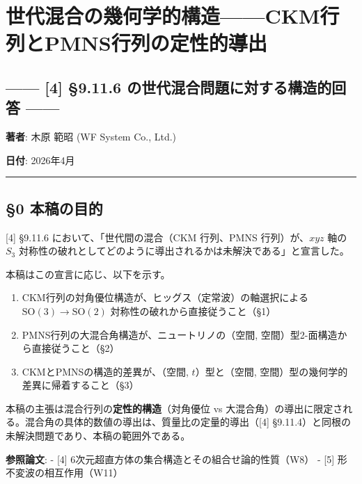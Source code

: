 \documentclass[
  a4paper,11pt]{ltjsarticle}
\author{}
\date{}
\providecommand{\tightlist}{%
  \setlength{\itemsep}{0pt}\setlength{\parskip}{0pt}}
\begin{document}
\section{世代混合の幾何学的構造------CKM行列とPMNS行列の定性的導出}\label{ux4e16ux4ee3ux6df7ux5408ux306eux5e7eux4f55ux5b66ux7684ux69cbux9020ckmux884cux5217ux3068pmnsux884cux5217ux306eux5b9aux6027ux7684ux5c0eux51fa}

\subsection{------ {[}4{]} §9.11.6 の世代混合問題に対する構造的回答
------}\label{ux306eux4e16ux4ee3ux6df7ux5408ux554fux984cux306bux5bfeux3059ux308bux69cbux9020ux7684ux56deux7b54}

\textbf{著者}: 木原 範昭 (WF System Co., Ltd.)

\textbf{日付}: 2026年4月

\begin{center}\rule{0.5\linewidth}{0.5pt}\end{center}

\subsection{§0 本稿の目的}\label{ux672cux7a3fux306eux76eeux7684}

{[}4{]} §9.11.6 において、「世代間の混合（CKM 行列、PMNS
行列）が、\(xyz\) 軸の \(S_3\)
対称性の破れとしてどのように導出されるかは未解決である」と宣言した。

本稿はこの宣言に応じ、以下を示す。

\begin{enumerate}
\def\labelenumi{\arabic{enumi}.}
\tightlist
\item
  CKM行列の対角優位構造が、ヒッグス（定常波）の軸選択による
  \(\mathrm{SO}(3) \to \mathrm{SO}(2)\)
  対称性の破れから直接従うこと（§1）
\item
  PMNS行列の大混合角構造が、ニュートリノの（空間,
  空間）型2-面構造から直接従うこと（§2）
\item
  CKMとPMNSの構造的差異が、（空間, \(t\)）型と（空間,
  空間）型の幾何学的差異に帰着すること（§3）
\end{enumerate}

本稿の主張は混合行列の\textbf{定性的構造}（対角優位 vs
大混合角）の導出に限定される。混合角の具体的数値の導出は、質量比の定量的導出（{[}4{]}
§9.11.4）と同根の未解決問題であり、本稿の範囲外である。

\textbf{参照論文}: - {[}4{]}
6次元超直方体の集合構造とその組合せ論的性質（W8） - {[}5{]}
形不変波の相互作用（W11）
\end{document}

